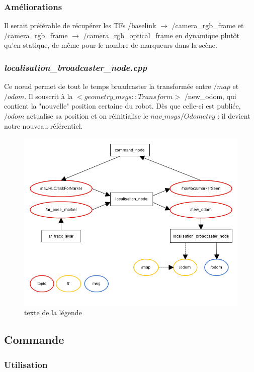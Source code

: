 \documentclass[10pt,a4paper]{article}
\begin{document}
\subsubsection*{Améliorations}
Il serait préférable de récupérer les TFs /baselink $\rightarrow$ /camera\_rgb\_frame et /camera\_rgb\_frame $\rightarrow$ /camera\_rgb\_optical\_frame en dynamique plutôt qu'en statique, de même pour le nombre de marqueurs dans la scène.

\subsubsection{\textit{localisation\_broadcaster\_node.cpp}}

Ce nœud permet de tout le temps broadcaster la transformée entre $/map$ et $/odom$. Il souscrit à la $<geometry\_msgs::Transform>$ /new\_odom, qui contient la "nouvelle" position certaine du robot. Dès que celle-ci est publiée, $/odom$ actualise sa position et on réinitialise le $nav\_msgs/Odometry$ : il devient notre nouveau référentiel.

\begin{figure}
\center
\includegraphics[scale=0.6]{figures/rqt_loca.png} 
\caption{texte de la légende}	
\end{figure}




\subsection{Commande}
\label{sec:commande}
\subsubsection*{Utilisation}
\end{document}
